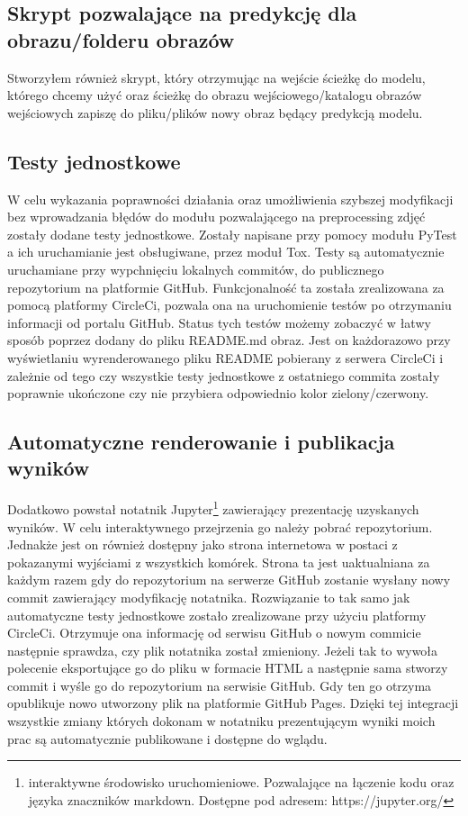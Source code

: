 \documentclass{article}
\begin{document}
\subsection{Skrypt pozwalające na predykcję dla obrazu/folderu obrazów}
Stworzyłem również skrypt, który otrzymując na wejście ścieżkę do modelu, którego chcemy użyć oraz
ścieżkę do obrazu wejściowego/katalogu obrazów wejściowych zapiszę do pliku/plików nowy obraz będący predykcją modelu.
\subsection{Testy jednostkowe}
W celu wykazania poprawności działania oraz umożliwienia szybszej modyfikacji bez wprowadzania błędów do modułu pozwalającego na preprocessing zdjęć
zostały dodane testy jednostkowe. Zostały napisane przy pomocy modułu PyTest a ich uruchamianie jest obsługiwane, przez moduł Tox.
Testy są automatycznie uruchamiane przy wypchnięciu lokalnych commitów, do publicznego repozytorium na platformie GitHub.
Funkcjonalność ta została zrealizowana za pomocą platformy CircleCi, pozwala ona na uruchomienie testów po otrzymaniu informacji od portalu GitHub.
Status tych testów możemy zobaczyć w łatwy sposób poprzez dodany do pliku README.md obraz.
Jest on każdorazowo przy wyświetlaniu wyrenderowanego pliku README pobierany z serwera CircleCi i zależnie od tego czy wszystkie testy jednostkowe z ostatniego commita zostały poprawnie ukończone czy nie przybiera odpowiednio kolor zielony/czerwony.
\subsection{Automatyczne renderowanie i publikacja wyników}
Dodatkowo powstał notatnik Jupyter\footnote{interaktywne środowisko uruchomieniowe. Pozwalające na łączenie kodu oraz języka znaczników markdown. Dostępne pod adresem: https://jupyter.org/} zawierający prezentację uzyskanych wyników.
W celu interaktywnego przejrzenia go należy pobrać repozytorium.
Jednakże jest on również dostępny jako strona internetowa w postaci z pokazanymi wyjściami z wszystkich komórek.
Strona ta jest uaktualniana za każdym razem gdy do repozytorium na serwerze GitHub zostanie wysłany nowy commit zawierający modyfikację notatnika.
Rozwiązanie to tak samo jak automatyczne testy jednostkowe zostało zrealizowane przy użyciu platformy CircleCi.
Otrzymuje ona informację od serwisu GitHub o nowym commicie następnie sprawdza, czy plik notatnika został zmieniony.
Jeżeli tak to wywoła polecenie eksportujące go do pliku w formacie HTML a następnie sama stworzy commit i wyśle go do repozytorium na serwisie GitHub.
Gdy ten go otrzyma opublikuje nowo utworzony plik na platformie GitHub Pages.
Dzięki tej integracji wszystkie zmiany których dokonam w notatniku prezentującym wyniki moich prac są automatycznie publikowane i dostępne do wglądu.
\end{document}
